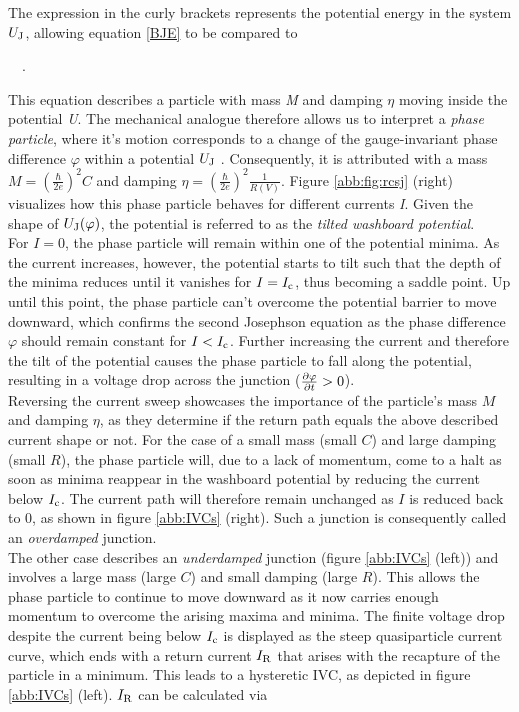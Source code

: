 The expression in the curly brackets represents the potential energy in the system $U_{\rm J}$, allowing equation \ref{BJE} to be compared to 

 \ \ .

This equation describes a particle with mass \textit{M} and damping $\eta$ moving inside the potential \textit{U}. The mechanical analogue therefore allows us to interpret a \textit{phase particle}, where it's motion corresponds to a change of the gauge-invariant phase difference $\varphi$ within a potential $U_{\rm J}$ \cite{Clarke2004}. Consequently, it is attributed with a mass $M=\left(\frac{\hbar}{2 e}\right)^2C$ and damping $\eta=\left(\frac{\hbar}{2 e}\right)^2\frac{1}{R(V)}$. Figure \ref{abb:fig:rcsj} (right) visualizes how this phase particle behaves for different currents \textit{I}. Given the shape of $U_{\rm J}(\varphi)$, the potential is referred to as the \textit{tilted washboard potential}. \\
For $I=0$, the phase particle will remain within one of the potential minima. As the current increases, however, the potential starts to tilt such that the depth of the minima reduces until it vanishes for $I=I_{\rm c}$, thus becoming a saddle point. Up until this point, the phase particle can't overcome the potential barrier to move downward, which confirms the second Josephson equation as the phase difference $\varphi$ should remain constant for $I<I_{\rm c}$. Further increasing the current and therefore the tilt of the potential causes the phase particle to fall along the potential, resulting in a voltage drop across the junction ($\frac{\partial\varphi}{\partial t}>0$). \\

Reversing the current sweep showcases the importance of the particle's mass $M$ and damping $\eta$, as they determine if the return path equals the above described current shape or not. For the case of a small mass (small $C$) and large damping (small $R$), the phase particle will, due to a lack of momentum, come to a halt as soon as minima reappear in the washboard potential by reducing the current below $I_{\rm c}$. The current path will therefore remain unchanged as $I$ is reduced back to 0, as shown in figure \ref{abb:IVCs} (right). Such a junction is consequently called an \textit{overdamped} junction. \\
The other case describes an \textit{underdamped} junction (figure \ref{abb:IVCs} (left)) and involves a large mass (large $C$) and small damping (large $R$). This allows the phase particle to continue to move downward as it now carries enough momentum to overcome the arising maxima and minima. The finite voltage drop despite the current being below $I_{\rm c}$ is displayed as the steep quasiparticle current curve, which ends with a return current $I_{\rm R}$ that arises with the recapture of the particle in a minimum. This leads to a hysteretic IVC, as depicted in figure \ref{abb:IVCs} (left). $I_{\rm R}$ can be calculated via \cite{Likharev1986}

